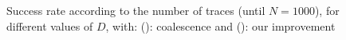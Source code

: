 \documentclass[conference,twocolumn]{IEEEtran}
\begin{document}
  \begin{figure}%
    \centering
   
    \caption{Success rate according to the number of traces (\colorbox[rgb]{0.9,0.9,0.9} {until $N=1000$}), for different values of $D$, with: ({\color{blue}{$\bullet$}}): coalescence and ({\color{red}{$\bullet$}}): our improvement}
    \label{fig:1000}
\end{figure}
  
\end{document}
